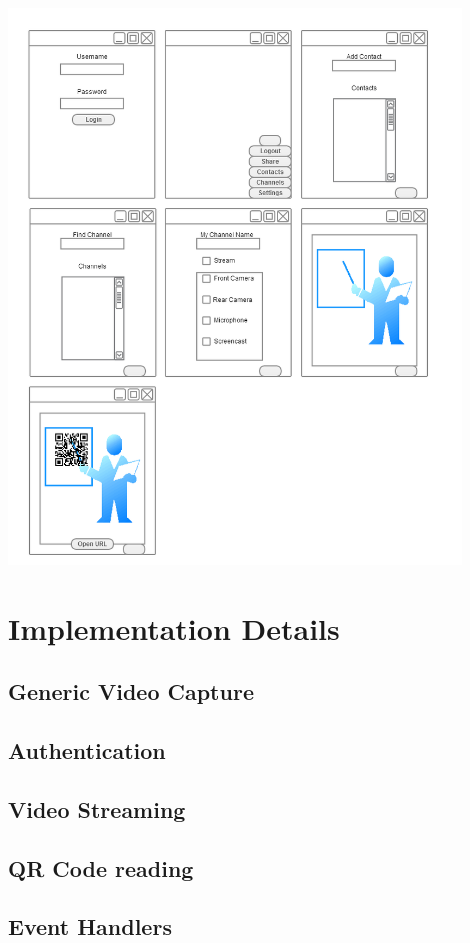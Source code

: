\documentclass[a4paper,12pt]{report}
\begin{document}
\includegraphics[width=12cm]{MobileUI}

\chapter{Implementation Details}
\section{Generic Video Capture}
\section{Authentication}
\section{Video Streaming}
\section{QR Code reading}
\section{Event Handlers}


\end{document}
